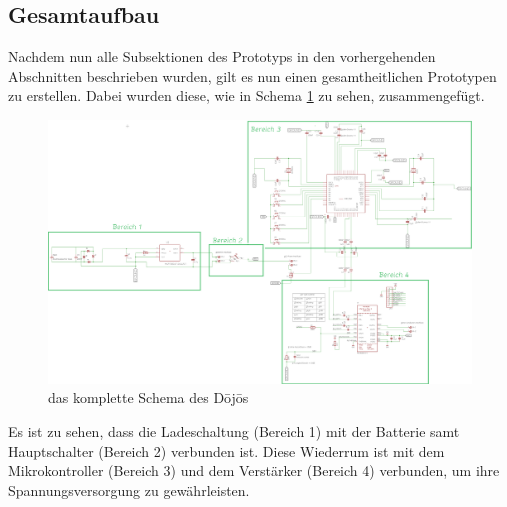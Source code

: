 \subsection{Gesamtaufbau} \label{sec:gesamtaufbau}
Nachdem nun alle Subsektionen des Prototyps in den vorhergehenden Abschnitten beschrieben wurden, gilt es nun einen gesamtheitlichen Prototypen zu erstellen. Dabei wurden diese, wie in Schema \ref{fig:dojo-schema} zu sehen, zusammengefügt. 

\begin{figure}[H]
	\begin{center}
		\includegraphics[width=160mm]{data/dojo-schema_2.png}
		\caption[das komplette Schema des Dōjōs]{das komplette Schema des Dōjōs} %
		\label{fig:dojo-schema}
	\end{center}
\end{figure}

Es ist zu sehen, dass die Ladeschaltung (Bereich 1) mit der Batterie samt Hauptschalter (Bereich 2) verbunden ist. Diese Wiederrum ist mit dem Mikrokontroller (Bereich 3) und dem Verstärker (Bereich 4) verbunden, um ihre Spannungsversorgung zu gewährleisten.
 
